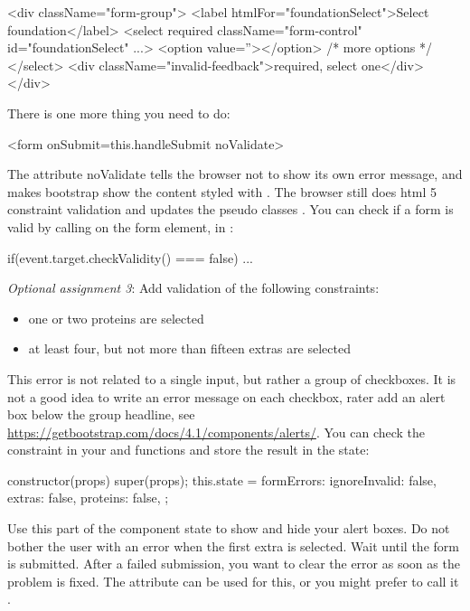 \documentclass[fleqn, article, a4paper]{memoir}
\begin{document}
\begin{Assignments}
\begin{Code}
<div className="form-group">
  <label htmlFor="foundationSelect">Select foundation</label>
  <select required className="form-control" id="foundationSelect" ...>
    <option value=''></option>
    {/* more options */}
  </select>
  <div className="invalid-feedback">required, select one</div>
</div>
\end{Code}
There is one more thing you need to do:
\begin{Code}
<form onSubmit={this.handleSubmit} noValidate>
\end{Code}
The attribute noValidate tells the browser not to show its own error message, and makes bootstrap show the content styled with . The browser still does html 5 constraint validation and updates the pseudo classes . You can check if a form is valid by calling  on the form element, in :
\begin{Code}
if(event.target.checkValidity() === false){ ... }
\end{Code}

\item \emph{Optional assignment 3}: Add validation of the following constraints:
\begin{itemize}
  \item one or two proteins are selected
  \item at least four, but not more than fifteen extras are selected
\end{itemize}
This error is not related to a single input, but rather a group of checkboxes. It is not a good idea to write an error message on each checkbox, rater add an alert box below the group headline, see \url{https://getbootstrap.com/docs/4.1/components/alerts/}. You can check the constraint in your  and  functions and store the result in the state:
\begin{Code}
constructor(props) {
  super(props);
  this.state = {
    formErrors: {
      ignoreInvalid: false,
      extras: false,
      proteins: false,
    }
  };
}
\end{Code}
Use this part of the component state to show and hide your alert boxes. Do not bother the user with an error when the first extra is selected. Wait until the form is submitted. After a failed submission, you want to clear the error as soon as the problem is fixed. The attribute  can be used for this, or you might prefer to call it .

\end{Assignments}


\end{document}
